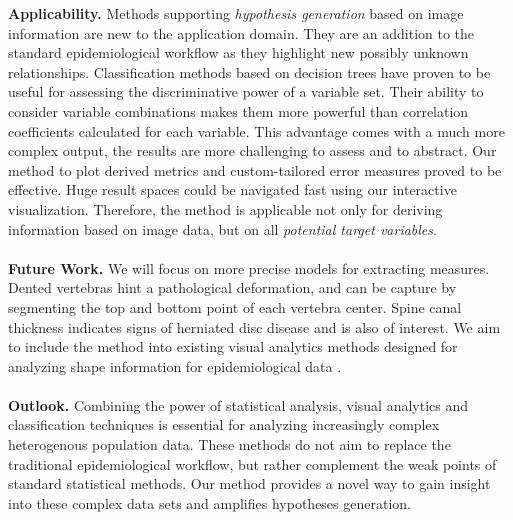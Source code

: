 \documentclass[a4paper,twoside]{style/article}
\begin{document}
\noindent \textbf{Applicability.}
Methods supporting \emph{hypothesis generation} based on image information are new to the application domain.
They are an addition to the standard epidemiological workflow as they highlight new possibly unknown relationships.
Classification methods based on decision trees have proven to be useful for assessing the discriminative power of a variable set.
Their ability to consider variable combinations makes them more powerful than correlation coefficients calculated for each variable.
This advantage comes with a much more complex output, the results are more challenging to assess and to abstract.
Our method to plot derived metrics and custom-tailored error measures proved to be effective.
Huge result spaces could be navigated fast using our interactive visualization.
Therefore, the method is applicable not only for deriving information based on image data, but on all \emph{potential target variables}.
\\\\
\noindent \textbf{Future Work.}
We will focus on more precise models for extracting measures.
Dented vertebras hint a pathological deformation, and can be capture by segmenting the top and bottom point of each vertebra center.
Spine canal thickness indicates signs of herniated disc disease and is also of interest.
We aim to include the method into existing visual analytics methods designed for analyzing shape information for epidemiological data \cite{Klemm2014VIS}.
\\\\
\noindent \textbf{Outlook.}
Combining the power of statistical analysis, visual analytics and classification techniques is essential for analyzing increasingly complex heterogenous population data.
These methods do not aim to replace the traditional epidemiological workflow, but rather complement the weak points of standard statistical methods.
Our method provides a novel way to gain insight into these complex data sets and amplifies hypotheses generation.
\end{document}
